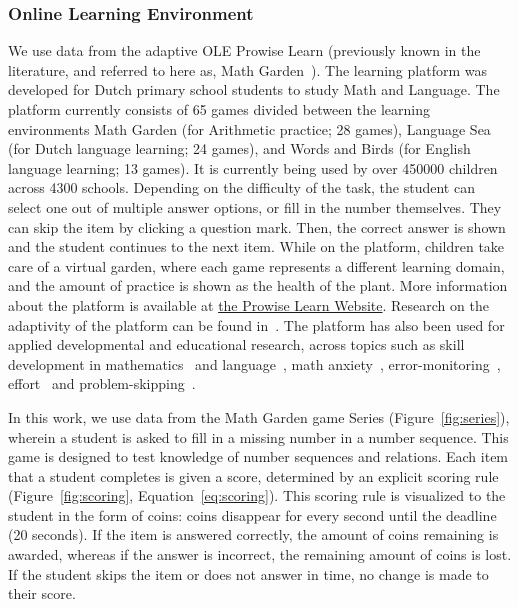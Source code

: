 \documentclass{edm_article}
\begin{document}
\subsubsection{Online Learning Environment}
We use data from the adaptive OLE Prowise Learn (previously known in the literature, and referred to here as, Math Garden~\cite{klinkenberg2011computer}). The learning platform was developed for Dutch primary school students to study Math and Language. The platform currently consists of 65 games divided between the learning environments Math Garden (for Arithmetic practice; 28 games), Language Sea (for Dutch language learning; 24 games), and Words and Birds (for English language learning; 13 games). It is currently being used by over \num{450000} children across \num{4300} schools. Depending on the difficulty of the task, the student can select one out of multiple answer options, or fill in the number themselves. They can skip the item by clicking a question mark. Then, the correct answer is shown and the student continues to the next item. While on the platform, children take care of a virtual garden, where each game represents a different learning domain, and the amount of practice is shown as the health of the plant. More information about the platform is available at \href{https://www.prowise.com/en/product/prowise-learn/}{the Prowise Learn Website}. Research on the adaptivity of the platform can be found in~\cite{klinkenberg2011computer, brinkhuis2018learning, brinkhuis2020governing, hofman2018solution}. The platform has also been used for applied developmental and educational research, across topics such as skill development in mathematics~\cite{ou2019modeling} and language~\cite{kievit2019mutualistic}, math anxiety~\cite{jansen2013influence, jansen2016affective, hilz2023relationship}, error-monitoring~\cite{de2022post, de2021error}, effort~\cite{savi2023combating} and problem-skipping~\cite{savi2018delaying}. 

In this work, we use data from the Math Garden game Series (Figure~\ref{fig:series}), wherein a student is asked to fill in a missing number in a number sequence. This game is designed to test knowledge of number sequences and relations. Each item that a student completes is given a score, determined by an explicit scoring rule (Figure~\ref{fig:scoring}, Equation~\ref{eq:scoring}). This scoring rule is visualized to the student in the form of coins: coins disappear for every second until the deadline (20 seconds). If the item is answered correctly, the amount of coins remaining is awarded, whereas if the answer is incorrect, the remaining amount of coins is lost. If the student skips the item or does not answer in time, no change is made to their score. 
\end{document}
